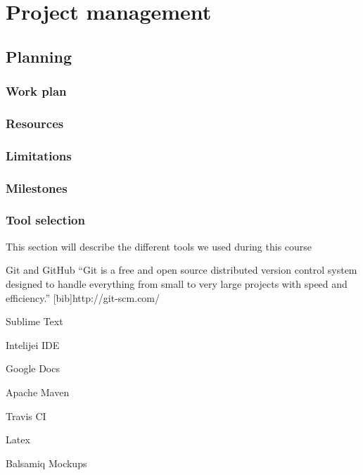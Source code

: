 
\chapter{Project management} %

\label{Project management} %


\section{Planning}
\subsection{Work plan}

\subsection{Resources}
\subsection{Limitations}

\subsection{Milestones}

\subsection{Tool selection}
This section will describe the different tools we used during this course

Git and GitHub
``Git is a free and open source distributed version control system designed to handle everything from small to very large projects with speed and efficiency.''
[bib]http://git-scm.com/

Sublime Text 

Intelijei IDE

Google Docs


Apache Maven

Travis CI

Latex

Balsamiq Mockups

